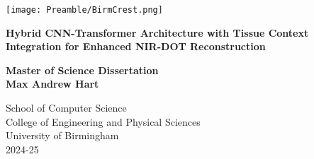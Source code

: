 
\thispagestyle{empty}

\begin{spacing}{2}
	\begin{center}
		\texttt{[image: Preamble/BirmCrest.png]}
	\end{center}
	\vspace{10mm}
	\begin{center}
		\textbf{\Large Hybrid CNN-Transformer Architecture with Tissue Context Integration for Enhanced NIR-DOT Reconstruction}
		\vspace{10mm}
	\end{center}
	\begin{center}
		\textbf{\large Master of Science Dissertation}
		\vspace{20mm}
		\\\textbf{\Large Max Andrew Hart}
		\vspace{30mm}
	\end{center}
	\begin{center}
		{\large School of Computer Science}
		\\ {\large College of Engineering and Physical Sciences}
		\\ {\large University of Birmingham}
		\\ {\large 2024-25}
	\end{center}
\end{spacing}


